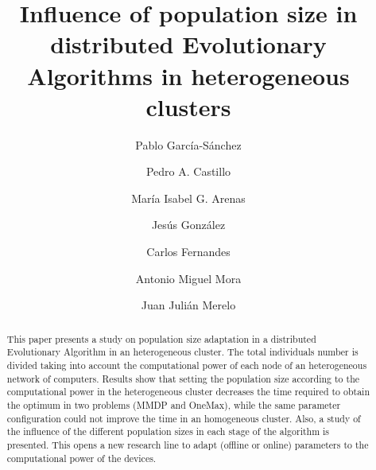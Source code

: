 \documentclass[final,1p,times]{elsarticle}
\begin{document}
\begin{frontmatter}



\title{Influence of population size in distributed Evolutionary Algorithms in heterogeneous clusters}


\author[ugr]{Pablo Garc\'ia-S\'anchez}
\author[ugr]{Pedro A. Castillo}
\author[ugr]{Mar\'ia Isabel G. Arenas}
\author[ugr]{Jes\'us Gonz\'alez}
\author[laseeb]{Carlos Fernandes}
\author[ugr]{Antonio Miguel Mora}
\author[ugr]{Juan Juli\'an Merelo}

\address[ugr]{Department of Computer Architecture and Computer Technology and CITIC-UGR, University of Granada, Granada, Spain. Tel: +34958241778. Fax: +34958248993}
\address[laseeb]{LaSEEB-ISR-IST, Technical University of Lisbon (IST), Lisbon, Portugal}%

\begin{abstract}
This paper presents a study on population size adaptation in a distributed Evolutionary Algorithm in an heterogeneous cluster. The total individuals number is divided taking into account the computational power of each node of an heterogeneous network of computers. Results show that setting the population size according to the computational power in the heterogeneous cluster decreases the time required to obtain the optimum in two problems (MMDP and OneMax), while the same parameter configuration could not improve the time in an homogeneous cluster. Also, a study of the influence of the different population sizes in each stage of the algorithm is presented. This opens a new research line to adapt (offline or online) parameters to the computational power of the devices.


\end{abstract}
\end{frontmatter}
\end{document}
